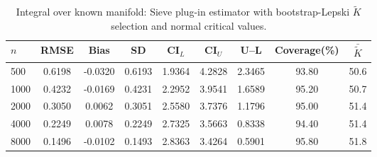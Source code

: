 \begin{table}[!h]
\centering
\small
\caption{Integral over known manifold: Sieve plug-in estimator with bootstrap-Lepski $\tilde{K}$ selection and normal critical values.}
\label{tab:Sim1_Circle}
\begin{tabular}{lcccccccc}
\hline\hline
$n$ & RMSE & Bias & SD & CI$_L$ & CI$_U$ & U--L & Coverage(\%) & $\bar{\tilde{K}}$\\
\hline
500 & 0.6198 & -0.0320 & 0.6193 & 1.9364 & 4.2828 & 2.3465 & 93.80 & 50.6\\
1000 & 0.4232 & -0.0169 & 0.4231 & 2.2952 & 3.9541 & 1.6589 & 95.20 & 50.7\\
2000 & 0.3050 & 0.0062 & 0.3051 & 2.5580 & 3.7376 & 1.1796 & 95.00 & 51.4\\
4000 & 0.2249 & 0.0078 & 0.2249 & 2.7325 & 3.5663 & 0.8338 & 94.40 & 51.4\\
8000 & 0.1496 & -0.0102 & 0.1493 & 2.8363 & 3.4264 & 0.5901 & 95.80 & 51.8\\
\hline\hline
\end{tabular}
\end{table}
